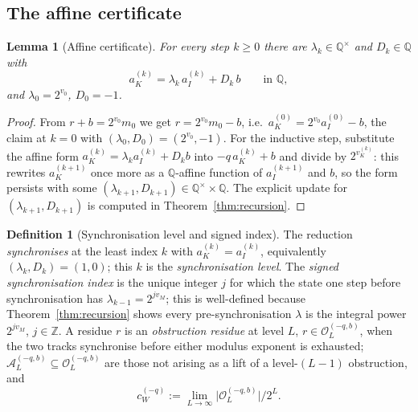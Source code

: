 \documentclass[11pt,reqno]{amsart}
\theoremstyle{plain}
\newtheorem{lemma}[theorem]{Lemma}
\theoremstyle{definition}
\newtheorem{definition}[theorem]{Definition}
\theoremstyle{remark}
\newcommand{\Z}{\mathbb{Z}}
\newcommand{\Q}{\mathbb{Q}}
\newcommand{\Obs}{\mathcal{O}}
\newcommand{\Atom}{\mathcal{A}}
\newcommand{\vk}{v_{K}}
\newcommand{\aK}{a_{K}}
\newcommand{\aI}{a_{I}}
\newcommand{\vM}{v_{M}}
\newcommand{\cWq}{c_{W}^{(-q)}}
\newcommand{\Obsq}{\Obs_{L}^{(-q,b)}}
\newcommand{\Atomq}{\Atom_{L}^{(-q,b)}}
\begin{document}
\subsection{The affine certificate}

\begin{lemma}[Affine certificate]\label{lem:certificate}
For every step $k \ge 0$ there are $\lambda_k \in \Q^{\times}$ and
$D_k \in \Q$ with
\[
\aK^{(k)} = \lambda_k\, \aI^{(k)} + D_k\, b \qquad \text{in } \Q,
\]
and $\lambda_0 = 2^{v_0}$, $D_0 = -1$.
\end{lemma}

\begin{proof}
From $r + b = 2^{v_0} m_0$ we get $r = 2^{v_0} m_0 - b$, i.e.\
$\aK^{(0)} = 2^{v_0}\aI^{(0)} - b$, the claim at $k = 0$ with
$(\lambda_0, D_0) = (2^{v_0}, -1)$. For the inductive step, substitute the
affine form $\aK^{(k)} = \lambda_k \aI^{(k)} + D_k b$ into
$-q\,\aK^{(k)} + b$ and divide by $2^{\vk^{(k)}}$: this rewrites
$\aK^{(k+1)}$ once more as a $\Q$-affine function of $\aI^{(k+1)}$ and $b$,
so the form persists with some $(\lambda_{k+1}, D_{k+1}) \in
\Q^{\times} \times \Q$. The explicit update for $(\lambda_{k+1}, D_{k+1})$
is computed in Theorem~\ref{thm:recursion}.
\end{proof}

\begin{definition}[Synchronisation level and signed index]\label{def:sync}
The reduction \emph{synchronises} at the least index $k$ with
$\aK^{(k)} = \aI^{(k)}$, equivalently $(\lambda_k, D_k) = (1, 0)$; this $k$ is
the \emph{synchronisation level}. The \emph{signed synchronisation index} is
the unique integer $j$ for which the state one step before synchronisation
has $\lambda_{k-1} = 2^{j\vM}$; this is well-defined because
Theorem~\ref{thm:recursion} shows every pre-synchronisation $\lambda$ is the
integral power $2^{j\vM}$, $j \in \Z$. A residue $r$ is an
\emph{obstruction residue} at level $L$, $r \in \Obsq$, when the two tracks
synchronise before either modulus exponent is exhausted; $\Atomq \subseteq
\Obsq$ are those not arising as a lift of a level-$(L-1)$ obstruction, and
\[
\cWq := \lim_{L \to \infty} \lvert \Obsq \rvert / 2^L .
\]
\end{definition}
\end{document}
